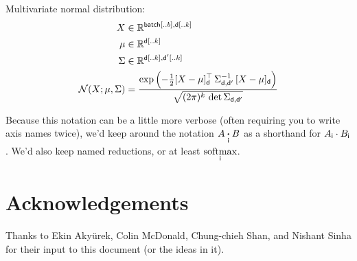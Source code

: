 \documentclass{article}
\begin{document}
Multivariate normal distribution:
\begin{align*} 
X &\in \mathbb{R}^{\nset{batch}{..{b}}, \nset{d}{..{k}}}  \\
\mu &\in \mathbb{R}^{{\nset{d}{..{k}}}}  \\
\Sigma & \in   \mathbb{R}^{{\nset{d}{..k}, \nset{d'}{..k}}}  \\
{\cal N}(X; \mu, \Sigma) &= \frac{\displaystyle \exp\left(-\tfrac{1}{2} [X - \mu]_{\name{d}}^\top \, \Sigma_{\name{d},\name{d'}}^{-1} \, [X - \mu]_{\name{d}} \right)}{\sqrt{(2 \pi)^k \, \mathop{\text{det}} \Sigma_{\name{d},\name{d'}}}}
\end{align*}

Because this notation can be a little more verbose (often requiring you to write axis names twice), we'd keep around the notation $A \ndot{i} B$ as a shorthand for $A_{\name{i}} \cdot B_{\name{i}}$. We'd also keep named reductions, or at least $\nfun{i}{softmax}$.

\section*{Acknowledgements}

Thanks to Ekin Aky\"{u}rek, Colin McDonald, Chung-chieh Shan, and Nishant Sinha for their input to this document (or the ideas in it).

\iffalse %
\section*{References}
\fi



\end{document}
